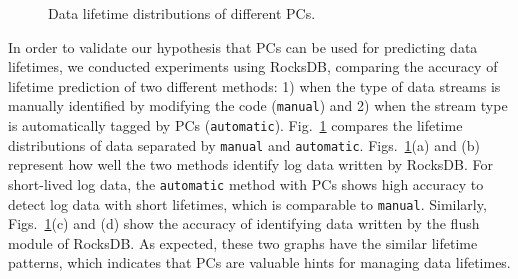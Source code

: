 \begin{figure}[!t]
\centering
\vspace{-10pt}
\hspace{1pt}
\hfill
\vspace{-10pt}
\caption{Data lifetime distributions of different PCs.} 
\label{fig:types_and_PCs}
\vspace{-15pt}
\end{figure}

In order to validate our hypothesis that PCs can be used for predicting 
data lifetimes, we
conducted experiments using RocksDB, comparing the accuracy of lifetime
prediction of two different methods: 1) when the type of data streams is
manually identified by modifying the code (\texttt{manual}) and 2) when the
stream type is automatically tagged by PCs (\texttt{automatic}).
Fig.~\ref{fig:types_and_PCs} compares the lifetime distributions of data
separated by \texttt{manual} and \texttt{automatic}.
Figs.~\ref{fig:types_and_PCs}(a) and (b) represent how well the two methods
identify log data written by RocksDB. 
For short-lived log data, the \texttt{automatic} method with PCs
shows high accuracy to detect log data with short lifetimes, which is
comparable to \texttt{manual}. Similarly, Figs.~\ref{fig:types_and_PCs}(c) and
(d) show the accuracy of identifying data written by the flush module of
RocksDB. As expected, these two graphs have the similar lifetime patterns,
which indicates that PCs are valuable hints for managing data lifetimes.

